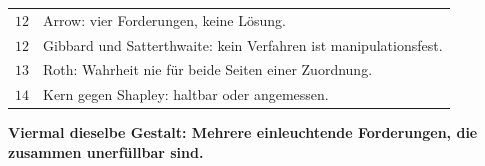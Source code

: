 \begin{merksatz}
\begin{center}
{\small
\renewcommand{\arraystretch}{1.48}
\begin{tabular}{@{}P{1.8cm}P{6.6cm}@{}}
\toprule
$12$ & Arrow: vier Forderungen, keine Lösung.\\
$12$ & Gibbard und Satterthwaite: kein Verfahren ist manipulationsfest.\\
$13$ & Roth: Wahrheit nie für beide Seiten einer Zuordnung.\\
$14$ & Kern gegen Shapley: haltbar oder angemessen.\\
\bottomrule
\end{tabular}}
\end{center}

\begin{center}
\begin{minipage}{0.9\textwidth}
\textbf{Viermal dieselbe Gestalt: Mehrere einleuchtende Forderungen, die zusammen unerfüllbar sind.}
\end{minipage}
\end{center}

\begin{center}
\begin{minipage}{0.88\textwidth}
\end{minipage}
\end{center}
\end{merksatz}

